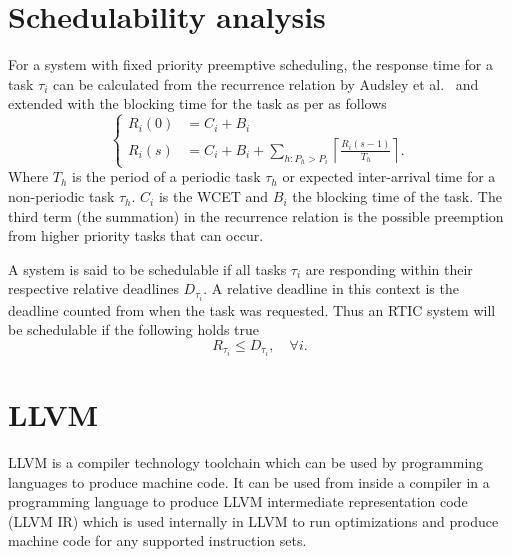 \section{Schedulability analysis}
\label{theory:schedulability}
For a system with fixed priority preemptive scheduling, the response time for
a task $\tau_i$ can be calculated from the recurrence relation by Audsley et
al.\ \cite{audsley93} and extended with the blocking time for the
task as per\cite{hardrealtimecomputingsystems} as follows
\begin{equation}
    \begin{cases}
        R_{i}(0) &= C_i + B_i \\
        R_{i}(s) &= C_i + B_i + \sum\limits_{h: P_h > P_i} \left\lceil \frac{R_{i}(s-1)}{T_h} \right\rceil.
    \end{cases}
\end{equation}
Where $T_h$ is the period of a periodic task $\tau_h$ or expected inter-arrival
time for a non-periodic task $\tau_h$. $C_i$ is the WCET and $B_i$ the blocking
time of the task. The third term (the summation) in the recurrence relation is
the possible preemption from higher priority tasks that can occur.


A system is said to be schedulable if all tasks $\tau_i$ are responding within
their respective relative deadlines $D_{\tau_i}$. A relative deadline in this
context is the deadline counted from when the task was requested. Thus an RTIC
system will be schedulable if the following holds true
\begin{equation}
    R_{\tau_i} \leq D_{\tau_i}, \quad \forall i.
\end{equation}

\section{LLVM}
LLVM is a compiler technology toolchain which can be used by programming
languages to produce machine code. It can be used from inside a compiler in a
programming language to produce LLVM intermediate representation code (LLVM IR)
which is used internally in LLVM to run optimizations and produce machine code
for any supported instruction sets.

